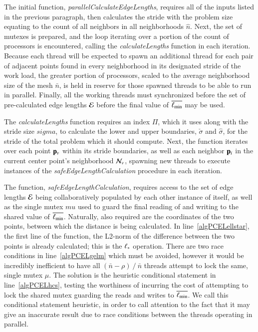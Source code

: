 The initial function, \textit{parallelCalculateEdgeLengths}, requires all of the inputs listed in the previous paragraph, then calculates the stride with the problem size equating to the count of all neighbors in all neighborhoods $\hat{n}$. Next, the set of mutexes is prepared, and the loop iterating over a portion of the count of processors is encountered, calling the \textit{calculateLengths} function in each iteration. Because each thread will be expected to spawn an additional thread for each pair of adjacent points found in every neighborhood in its designated stride of the work load, the greater portion of processors, scaled to the average neighborhood size of the mesh $\bar{n}$, is held in reserve for those spawned threads to be able to run in parallel. Finally, all the working threads must synchronized before the set of pre-calculated edge lengths $\mathcal{E}$ before the final value of $\overline{\ell_\text{min}}$ may be used.

The \textit{calculateLengths} function requires an index $\Pi$, which it uses along with the stride size $sigma$, to calculate the lower and upper boundaries, $\check{\sigma}$ and $\hat{\sigma}$, for the stride of the total problem which it should compute. Next, the function iterates over each point $\mathbf{p}_v$ within its stride boundaries, as well as each neighbor $\mathbf{p}_i$ in the current center point's neighborhood $\mathcal{N}_v$, spawning new threads to execute instances of the \textit{safeEdgeLengthCalculation} procedure in each iteration.

The function, \textit{safeEdgeLengthCalculation}, requires access to the set of edge lengths $\mathcal{E}$ being collaboratively populated by each other instance of itself, as well as the single mutex $mu$ used to guard the final reading of and writing to the shared value of $\overline{\ell_\text{min}}$. Naturally, also required are the coordinates of the two points, between which the distance is being calculated. In line~\ref{algPCELellstar}, the first line of the function, the L2-norm of the difference between the two points is already calculated; this is the $\ell_\ast$ operation. There are two race conditions in line~\ref{algPCELgelm} which must be avoided, however it would be incredibly inefficient to have all $(\bar{n}-\rho)\mathbin{/}\bar{n}$ threads attempt to lock the same, single mutex $\mu$. The solution is the heuristic conditional statement in line~\ref{algPCELhcs}, testing the worthiness of incurring the cost of attempting to lock the shared mutex guarding the reads and writes to $\overline{\ell_\text{min}}$. We call this conditional statement heuristic, in order to call attention to the fact that it may give an inaccurate result due to race conditions between the threads operating in parallel. 

